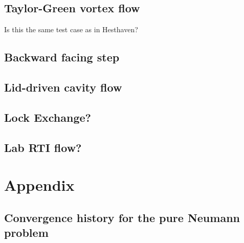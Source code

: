\subsection{Taylor-Green vortex flow}
Is this the same test case as in Hesthaven?

\subsection{Backward facing step}

\subsection{Lid-driven cavity flow}

\subsection{Lock Exchange?}
\subsection{Lab RTI flow?}

\section{Appendix}

\subsection{Convergence history for the pure Neumann problem}%

